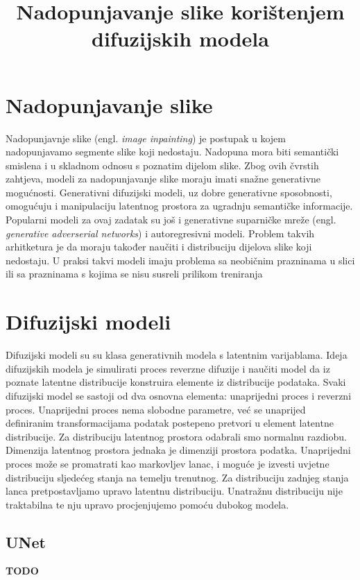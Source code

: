 \documentclass[10pt, a4paper, croatian]{article}
\title{Nadopunjavanje slike korištenjem difuzijskih modela}
\begin{document}
\maketitleabstract

\section{Nadopunjavanje slike}
Nadopunjavnje slike (engl. \emph{image inpainting}) je postupak u kojem nadopunjavamo segmente slike koji nedostaju. Nadopuna mora biti 
semantički smislena i u skladnom odnosu s poznatim dijelom slike. Zbog ovih čvrstih zahtjeva, modeli za nadopunjavanje slike moraju imati 
snažne generativne mogućnosti. Generativni difuzijski modeli, uz dobre generativne sposobnosti, omogućuju i manipulaciju latentnog prostora 
za ugradnju semantičke informacije. Popularni modeli za ovaj zadatak su još i generativne suparničke mreže 
(engl. \emph{generative adverserial networks}) i autoregresivni modeli. Problem takvih arhitketura je da moraju također naučiti i distribuciju
dijelova slike koji nedostaju. U praksi takvi modeli imaju problema sa neobičnim prazninama u slici ili sa prazninama s kojima se nisu
susreli prilikom treniranja


\section{Difuzijski modeli}
Difuzijski modeli su su klasa generativnih modela s latentnim varijablama. Ideja difuzijskih modela je simulirati proces reverzne difuzije 
i naučiti model da iz poznate latentne distribucije konstruira elemente iz distribucije podataka. Svaki difuzijski model se sastoji od dva
osnovna elementa: unaprijedni proces i reverzni proces. Unaprijedni proces nema slobodne parametre, već se unaprijed definiranim 
transformacijama podatak postepeno pretvori u element latentne distribucije. Za distribuciju latentnog prostora odabrali smo normalnu razdiobu.
Dimenzija latentnog prostora jednaka je dimenziji prostora podatka. Unaprijedni proces može se promatrati kao markovljev lanac, i moguće je 
izvesti uvjetne distribuciju sljedećeg stanja na temelju trenutnog. Za distribuciju zadnjeg stanja lanca pretpostavljamo upravo latentnu 
distribuciju. Unatražnu distribuciju nije traktabilna te nju upravo procjenjujemo pomoću dubokog modela. 

\subsection{UNet}
\textbf{TODO}
\end{document}
